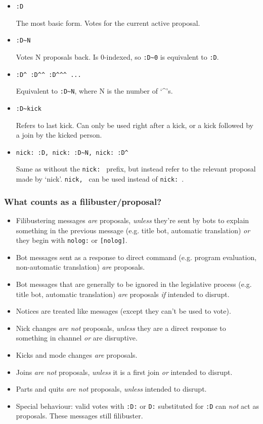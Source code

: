 \documentclass[11pt]{article}
\begin{document}
\begin{itemize}
\item \texttt{:D}

The most basic form. Votes for the current active proposal.

\item \texttt{:D\~{}N}

Votes N proposals back. Is 0-indexed, so \texttt{:D\~{}0} is equivalent to \texttt{:D}.

\item \texttt{:D\^{} :D\^{}\^{} :D\^{}\^{}\^{} ...}

Equivalent to \texttt{:D\~{}N}, where N is the number of `\^{}'s.

\item \texttt{:D\~{}kick}

Refers to last kick. Can only be used right after a kick, or a kick followed by a join
by the kicked person.

\item \texttt{nick: :D, nick: :D\~{}N, nick: :D\^{}}

Same as without the \texttt{nick: } prefix, but instead refer to the relevant proposal
made by `nick'. \texttt{nick, } can be used instead of \texttt{nick: }.
\end{itemize}


\subsubsection{What counts as a filibuster/proposal?}

\begin{itemize}
\item Filibustering messages \emph{are} proposals, \emph{unless} they're sent by 
bots to explain something in the previous message (e.g. title bot, automatic translation) 
\emph{or} they begin with \texttt{nolog:} or \texttt{[nolog]}.
\item Bot messages sent as a response to direct command (e.g. program evaluation,
non-automatic translation) \emph{are} proposals.
\item Bot messages that are generally to be ignored in the legislative process (e.g. title
bot, automatic translation) \emph{are} proposals \emph{if} intended to disrupt.
\item Notices are treated like messages (except they can't be used to vote).
\item Nick changes \emph{are not} proposals, \emph{unless} they are a direct response
to something in channel \emph{or} are disruptive.
\item Kicks and mode changes \emph{are} proposals.
\item Joins \emph{are not} proposals, \emph{unless} it is a first join \emph{or} intended
to disrupt.
\item Parts and quits \emph{are not} proposals, \emph{unless} intended to disrupt.
\item Special behaviour: valid votes with \texttt{:D:} or \texttt{D:} substituted for \texttt{:D}
can \emph{not} act as proposals. These messages still filibuster.
\end{itemize}
\end{document}
